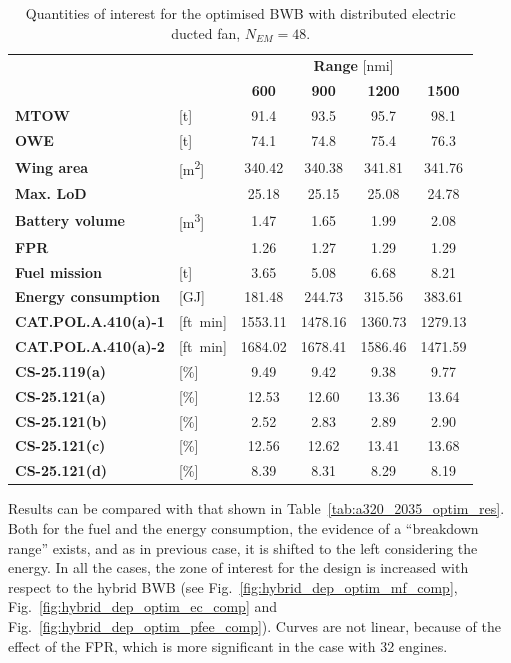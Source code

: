 \begin{table}[!h]
	\centering
	\begin{tabular}{l l c c c c}
		\cline{3-6}
		& & \multicolumn{4}{c}{\textbf{Range} [nmi]} \\
		& & \textbf{600} & \textbf{900} & \textbf{1200} & \textbf{1500} \\
		\hline
		\textbf{MTOW} & [\si{\tonne}] & 91.4 & 93.5 & 95.7 & 98.1 \\
		\textbf{OWE} & [\si{\tonne}] & 74.1 & 74.8 & 75.4 & 76.3 \\
		\textbf{Wing area} & [\si{\square\meter}] & 340.42 & 340.38 & 341.81 & 341.76 \\
		\textbf{Max. LoD} & & 25.18 & 25.15 & 25.08 & 24.78 \\
		\textbf{Battery volume} & [\si{\cubic\meter}] & 1.47 & 1.65 & 1.99 & 2.08 \\
		\textbf{FPR} & & 1.26 & 1.27 & 1.29 & 1.29 \\
		\textbf{Fuel mission} & [\si{\tonne}] & 3.65 & 5.08 & 6.68 & 8.21 \\
		\textbf{Energy consumption} & [\si{\giga\joule}] & 181.48 & 244.73 & 315.56 & 383.61 \\
		\hline
		\textbf{CAT.POL.A.410(a)-1} & [ft\si{\per\minute}] & 1553.11 & 1478.16 & 1360.73 & 1279.13 \\
		\textbf{CAT.POL.A.410(a)-2} & [ft\si{\per\minute}] & 1684.02 & 1678.41 & 1586.46 & 1471.59 \\
		\textbf{CS-25.119(a)} & [\%] & 9.49 & 9.42 & 9.38 & 9.77 \\
		\textbf{CS-25.121(a)} & [\%] & 12.53 & 12.60 & 13.36 & 13.64 \\
		\textbf{CS-25.121(b)} & [\%] & 2.52 & 2.83 & 2.89 & 2.90 \\
		\textbf{CS-25.121(c)} & [\%] & 12.56 & 12.62 & 13.41 & 13.68 \\
		\textbf{CS-25.121(d)} & [\%] & 8.39 & 8.31 & 8.29 & 8.19 \\
		\hline
	\end{tabular}
	\caption{Quantities of interest for the optimised BWB with distributed electric ducted fan, $N_{EM}=48$.}
	\label{tab:bwb_hybrid_dep_optim_res_n48}
\end{table}

Results can be compared with that shown in Table~\ref{tab:a320_2035_optim_res}. 
Both for the fuel and the energy consumption, the evidence of a ``breakdown range'' exists, and as in previous case, it is shifted to the left considering the energy. 
In all the cases, the zone of interest for the design is increased with respect to the hybrid BWB (see Fig.~\ref{fig:hybrid_dep_optim_mf_comp}, Fig.~\ref{fig:hybrid_dep_optim_ec_comp} and Fig.~\ref{fig:hybrid_dep_optim_pfee_comp}).
Curves are not linear, because of the effect of the FPR, which is more significant in the case with 32 engines. 


